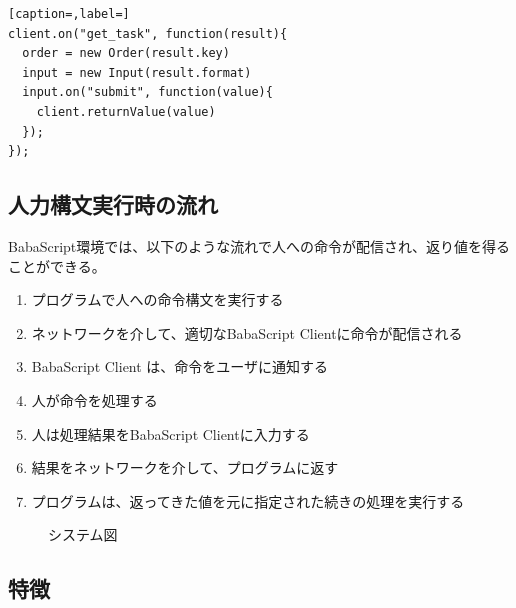\documentclass{deimj}
\begin{document}
\begin{lstlisting}[caption=,label=] 
client.on("get_task", function(result){
  order = new Order(result.key)
  input = new Input(result.format)
  input.on("submit", function(value){
    client.returnValue(value)
  });  
});
\end{lstlisting}

  
\subsection{人力構文実行時の流れ}
BabaScript環境では、以下のような流れで人への命令が配信され、返り値を得ることができる。

\begin{enumerate}
\item プログラムで人への命令構文を実行する
\item ネットワークを介して、適切なBabaScript Clientに命令が配信される
\item BabaScript Client は、命令をユーザに通知する
\item 人が命令を処理する
\item 人は処理結果をBabaScript Clientに入力する
\item 結果をネットワークを介して、プログラムに返す
\item プログラムは、返ってきた値を元に指定された続きの処理を実行する
\end{enumerate}

\begin{figure}[tb]
  \begin{center}
    \caption{システム図}
    \label{system}
  \end{center}
\end{figure}



\subsection{特徴}
\end{document}
